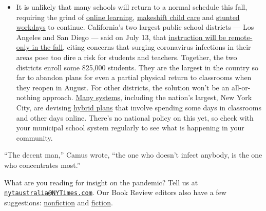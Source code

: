 \begin{itemize}
  \begin{itemize}
  \tightlist
  \item
    It is unlikely that many schools will return to a normal schedule
    this fall, requiring the grind of
    \href{https://www.nytimes3xbfgragh.onion/2020/06/05/us/coronavirus-education-lost-learning.html?action=click\&pgtype=Article\&state=default\&region=MAIN_CONTENT_3\&context=storylines_faq}{online
    learning},
    \href{https://www.nytimes3xbfgragh.onion/2020/05/29/us/coronavirus-child-care-centers.html?action=click\&pgtype=Article\&state=default\&region=MAIN_CONTENT_3\&context=storylines_faq}{makeshift
    child care} and
    \href{https://www.nytimes3xbfgragh.onion/2020/06/03/business/economy/coronavirus-working-women.html?action=click\&pgtype=Article\&state=default\&region=MAIN_CONTENT_3\&context=storylines_faq}{stunted
    workdays} to continue. California's two largest public school
    districts --- Los Angeles and San Diego --- said on July 13, that
    \href{https://www.nytimes3xbfgragh.onion/2020/07/13/us/lausd-san-diego-school-reopening.html?action=click\&pgtype=Article\&state=default\&region=MAIN_CONTENT_3\&context=storylines_faq}{instruction
    will be remote-only in the fall}, citing concerns that surging
    coronavirus infections in their areas pose too dire a risk for
    students and teachers. Together, the two districts enroll some
    825,000 students. They are the largest in the country so far to
    abandon plans for even a partial physical return to classrooms when
    they reopen in August. For other districts, the solution won't be an
    all-or-nothing approach.
    \href{https://bioethics.jhu.edu/research-and-outreach/projects/eschool-initiative/school-policy-tracker/}{Many
    systems}, including the nation's largest, New York City, are
    devising
    \href{https://www.nytimes3xbfgragh.onion/2020/06/26/us/coronavirus-schools-reopen-fall.html?action=click\&pgtype=Article\&state=default\&region=MAIN_CONTENT_3\&context=storylines_faq}{hybrid
    plans} that involve spending some days in classrooms and other days
    online. There's no national policy on this yet, so check with your
    municipal school system regularly to see what is happening in your
    community.
  \end{itemize}
\end{itemize}

``The decent man,'' Camus wrote, ``the one who doesn't infect anybody,
is the one who concentrates most.''

What are you reading for insight on the pandemic? Tell us at
\href{mailto:nytaustralia@NYTimes.com}{\nolinkurl{nytaustralia@NYTimes.com}}.
Our Book Review editors also have a few suggestions:
\href{https://www.nytimes3xbfgragh.onion/2020/02/24/books/pandemic-books-coronavirus.html}{nonfiction}
and
\href{https://www.nytimes3xbfgragh.onion/2020/03/12/books/coronavirus-reading.html}{fiction}.

